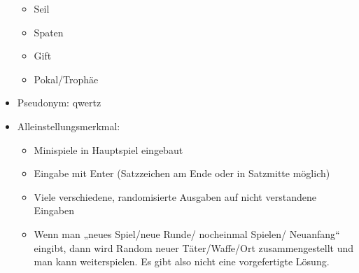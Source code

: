\documentclass[10pt,a4paper]{article}
\begin{document}
\begin{itemize}
\begin{itemize}
\item Seil
\item Spaten
\item Gift
\item Pokal/Trophäe
\end{itemize}
\item Pseudonym: qwertz
\item Alleinstellungsmerkmal:
\begin{itemize}
\item Minispiele in Hauptspiel eingebaut
\item Eingabe mit Enter (Satzzeichen am Ende oder in Satzmitte möglich)
\item Viele verschiedene, randomisierte Ausgaben auf nicht verstandene Eingaben
\item Wenn man „neues Spiel/neue Runde/ nocheinmal Spielen/ Neuanfang“ eingibt, dann wird Random neuer Täter/Waffe/Ort zusammengestellt und man kann weiterspielen. Es gibt also nicht eine vorgefertigte Lösung.
\end{itemize}
\end{itemize}
\end{document}
